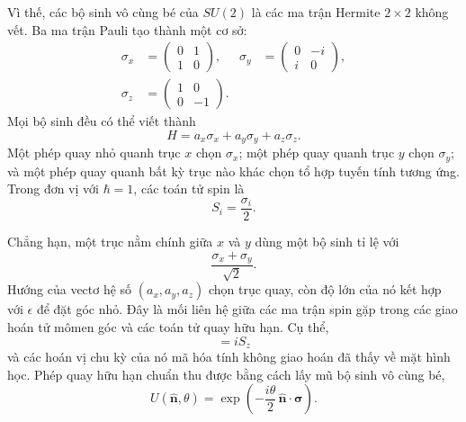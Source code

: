 Vì thế, các bộ sinh vô cùng bé của \(SU(2)\) là các ma trận Hermite \(2\times2\)
không vết. Ba ma trận Pauli tạo thành một cơ sở:
\begin{equation}
\begin{aligned}
\sigma_x&=
\begin{pmatrix}0&1\\1&0\end{pmatrix},
&
\sigma_y&=
\begin{pmatrix}0&-i\\i&0\end{pmatrix},
\\[0.4em]
\sigma_z&=
\begin{pmatrix}1&0\\0&-1\end{pmatrix}.
\end{aligned}
\end{equation}
Mọi bộ sinh đều có thể viết thành
\begin{equation}
H=a_x\sigma_x+a_y\sigma_y+a_z\sigma_z.
\end{equation}
Một phép quay nhỏ quanh trục \(x\) chọn \(\sigma_x\); một phép quay quanh
trục \(y\) chọn \(\sigma_y\); và một phép quay quanh bất kỳ trục nào khác chọn
tổ hợp tuyến tính tương ứng. Trong đơn vị với \(\hbar=1\), các toán tử
spin là
\begin{equation}
S_i=\frac{\sigma_i}{2}.
\end{equation}

Chẳng hạn, một trục nằm chính giữa \(x\) và \(y\) dùng một bộ sinh
tỉ lệ với
\begin{equation}
\frac{\sigma_x+\sigma_y}{\sqrt2}.
\end{equation}
Hướng của vectơ hệ số
\((a_x,a_y,a_z)\) chọn trục quay, còn độ lớn của nó kết hợp với
\(\epsilon\) để đặt góc nhỏ. Đây là mối liên hệ giữa các ma trận spin gặp trong các giao hoán tử mômen góc và các toán tử quay hữu hạn. Cụ thể,
\begin{equation}
[S_x,S_y]=iS_z
\end{equation}
và các hoán vị chu kỳ của nó mã hóa tính không giao hoán đã thấy về mặt hình học.
Phép quay hữu hạn chuẩn thu được bằng cách lấy mũ bộ sinh vô cùng bé,
\begin{equation}
U(\hat{\boldsymbol n},\theta)
=\exp\left(-\frac{i\theta}{2}\,
\hat{\boldsymbol n}\cdot\boldsymbol\sigma\right).
\end{equation}

